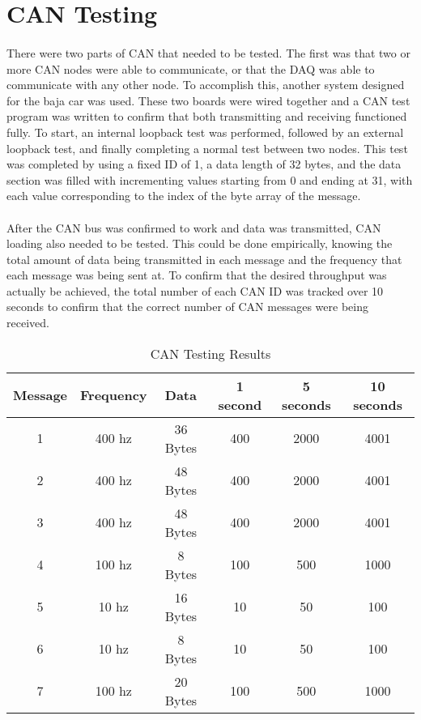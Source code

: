 \section{CAN Testing}

\paragraph{}
There were two parts of CAN that needed to be tested.
The first was that two or more CAN nodes were able to communicate, or that the DAQ was able to communicate with any other node.
To accomplish this, another system designed for the baja car was used.
These two boards were wired together and a CAN test program was written to confirm that both transmitting and receiving functioned fully.
To start, an internal loopback test was performed, followed by an external loopback test, and finally completing a normal test between two nodes.
This test was completed by using a fixed ID of 1, a data length of 32 bytes, and the data section was filled with incrementing values starting from 0 and ending at 31, with each value corresponding to the index of the byte array of the message.

\paragraph{}
After the CAN bus was confirmed to work and data was transmitted, CAN loading also needed to be tested.
This could be done empirically, knowing the total amount of data being transmitted in each message and the frequency that each message was being sent at.
To confirm that the desired throughput was actually be achieved, the total number of each CAN ID was tracked over 10 seconds to confirm that the correct number of CAN messages were being received.

\begin{table}[H] \label{tab:CANTesting}
\caption{CAN Testing Results}
\centering
\begin{tabular}{c c c c c c}
\hline\hline
Message & Frequency & Data & 1 second & 5 seconds & 10 seconds \\ [0.5ex]
\hline
1 & 400 hz & 36 Bytes & 400 & 2000 & 4001 \\
2 & 400 hz & 48 Bytes & 400 & 2000 & 4001 \\
3 & 400 hz & 48 Bytes & 400 & 2000 & 4001 \\
4 & 100 hz & 8 Bytes & 100 & 500 & 1000 \\
5 & 10 hz & 16 Bytes & 10 & 50 & 100 \\
6 & 10 hz & 8 Bytes & 10 & 50 & 100 \\
7 & 100 hz & 20 Bytes & 100 & 500 & 1000 \\ [1ex]
\hline
\end{tabular}
\end{table}

